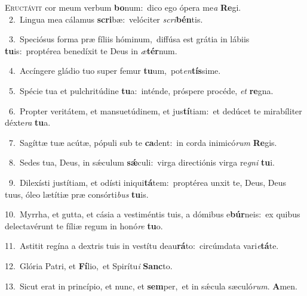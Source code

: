 \lettrine{\initial\textcolor{\initialcolor}{E}}{ructávit} cor meum verbum \textbf{bo}\-num:~\star dico ego ópera me\textit{a} \textbf{Re}\-gi.\\
{\numbfont\textcolor{\numbcolor}{~2.}}~Lingua mea cálamus \textbf{scri}\-bæ:~\star velóciter \textit{scri}\-\textbf{bén}tis.\par
{\numbfont\textcolor{\numbcolor}{~3.}}~Speciósus forma præ fíliis hóminum,~\dagger diffúsa est grátia in lábiis \textbf{tu}\-is:~\star proptérea benedíxit te Deus in \textit{æ}\-\textbf{tér}num.\par
{\numbfont\textcolor{\numbcolor}{~4.}}~Accíngere gládio tuo super femur \textbf{tu}\-um,~\star pot\-\textit{en}\-\textbf{tís}sime.\par
{\numbfont\textcolor{\numbcolor}{~5.}}~Spécie tua et pulchritúdine \textbf{tu}\-a:~\star inténde, próspere procéde, \textit{et} \textbf{re}\-gna.\par
{\numbfont\textcolor{\numbcolor}{~6.}}~Propter veritátem, et mansuetúdinem, et jus\-\textbf{tí}\-tiam:~\star et dedúcet te mirabíliter déxte\textit{ra} \textbf{tu}\-a.\par
{\numbfont\textcolor{\numbcolor}{~7.}}~Sagíttæ tuæ acútæ, pópuli sub te \textbf{ca}\-dent:~\star in corda inimicó\textit{rum} \textbf{Re}\-gis.\par
{\numbfont\textcolor{\numbcolor}{~8.}}~Sedes tua, Deus, in sǽculum \textbf{sǽ}\-culi:~\star virga directiónis virga re\textit{gni} \textbf{tu}\-i.\par
{\numbfont\textcolor{\numbcolor}{~9.}}~Dilexísti justítiam, et odísti iniqui\-\textbf{tá}\-tem:~\star proptérea unxit te, Deus, Deus tuus, óleo lætítiæ præ consórti\textit{bus} \textbf{tu}\-is.\par
{\numbfont\textcolor{\numbcolor}{10.}}~Myrrha, et gutta, et cásia a vestiméntis tuis, a dómibus e\-\textbf{búr}\-neis:~\star ex quibus delectavérunt te fíliæ regum in honó\textit{re} \textbf{tu}\-o.\par
{\numbfont\textcolor{\numbcolor}{11.}}~Astitit regína a dextris tuis in vestítu deau\-\textbf{rá}\-to:~\star circúmdata vari\-\textit{e}\-\textbf{tá}te.\par
{\numbfont\textcolor{\numbcolor}{12.}}~Glória Patri, et \textbf{Fí}\-lio,~\star et Spirítu\textit{i} \textbf{Sanc}\-to.\par
{\numbfont\textcolor{\numbcolor}{13.}}~Sicut erat in princípio, et nunc, et \textbf{sem}\-per,~\star et in sǽcula sæculó\-\textit{rum}\-. \textbf{A}\-men.\par
